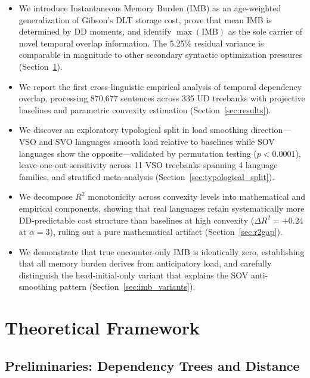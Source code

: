 \documentclass[11pt,letterpaper]{article}
\begin{document}
\begin{itemize}
  \item We introduce Instantaneous Memory Burden (IMB) as an age-weighted generalization of Gibson's DLT storage cost, prove that mean IMB is determined by DD moments, and identify $\max(\text{IMB})$ as the sole carrier of novel temporal overlap information. The 5.25\% residual variance is comparable in magnitude to other secondary syntactic optimization pressures (Section~\ref{sec:framework}).
  \item We report the first cross-linguistic empirical analysis of temporal dependency overlap, processing 870,677 sentences across 335 UD treebanks with projective baselines and parametric convexity estimation (Section~\ref{sec:results}).
  \item We discover an exploratory typological split in load smoothing direction---VSO and SVO languages smooth load relative to baselines while SOV languages show the opposite---validated by permutation testing ($p < 0.0001$), leave-one-out sensitivity across 11 VSO treebanks spanning 4 language families, and stratified meta-analysis (Section~\ref{sec:typological_split}).
  \item We decompose $R^2$ monotonicity across convexity levels into mathematical and empirical components, showing that real languages retain systematically more DD-predictable cost structure than baselines at high convexity ($\Delta R^2 = +0.24$ at $\alpha = 3$), ruling out a pure mathematical artifact (Section~\ref{sec:r2gap}).
  \item We demonstrate that true encounter-only IMB is identically zero, establishing that all memory burden derives from anticipatory load, and carefully distinguish the head-initial-only variant that explains the SOV anti-smoothing pattern (Section~\ref{sec:imb_variants}).
\end{itemize}


\section{Theoretical Framework}
\label{sec:framework}

\subsection{Preliminaries: Dependency Trees and Distance}
\end{document}
